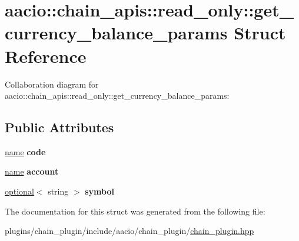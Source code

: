 \hypertarget{structaacio_1_1chain__apis_1_1read__only_1_1get__currency__balance__params}{}\section{aacio\+:\+:chain\+\_\+apis\+:\+:read\+\_\+only\+:\+:get\+\_\+currency\+\_\+balance\+\_\+params Struct Reference}
\label{structaacio_1_1chain__apis_1_1read__only_1_1get__currency__balance__params}


Collaboration diagram for aacio\+:\+:chain\+\_\+apis\+:\+:read\+\_\+only\+:\+:get\+\_\+currency\+\_\+balance\+\_\+params\+:
\subsection*{Public Attributes}
\begin{DoxyCompactItemize}
\item 
\mbox{\label{structaacio_1_1chain__apis_1_1read__only_1_1get__currency__balance__params_abd23fb538f835fbbf3c2dae0218e1c0a}} 
\mbox{\hyperlink{structaacio_1_1name}{name}} {\bfseries code}
\item 
\mbox{\label{structaacio_1_1chain__apis_1_1read__only_1_1get__currency__balance__params_a34330842307617f9ddc464d33fcd8504}} 
\mbox{\hyperlink{structaacio_1_1name}{name}} {\bfseries account}
\item 
\mbox{\label{structaacio_1_1chain__apis_1_1read__only_1_1get__currency__balance__params_a7821bcbe62cdad80433c22ddcb392e95}} 
\mbox{\hyperlink{classaacio_1_1optional}{optional}}$<$ string $>$ {\bfseries symbol}
\end{DoxyCompactItemize}


The documentation for this struct was generated from the following file\+:\begin{DoxyCompactItemize}
\item 
plugins/chain\+\_\+plugin/include/aacio/chain\+\_\+plugin/\mbox{\hyperlink{chain__plugin_8hpp}{chain\+\_\+plugin.\+hpp}}\end{DoxyCompactItemize}

